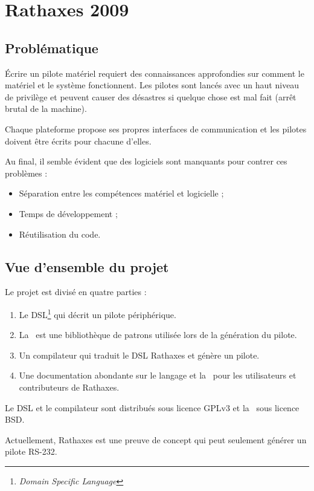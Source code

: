 \section{Rathaxes 2009}

\subsection{Problématique}

Écrire un pilote matériel requiert des connaissances approfondies sur comment le
matériel et le système fonctionnent. Les pilotes sont lancés avec un haut niveau
de privilège et peuvent causer des désastres si quelque chose est mal fait
(arr\^et brutal de la machine)\cite{linux-tutorial}.

Chaque plateforme propose ses propres interfaces de communication et les
pilotes doivent être écrits pour chacune d'elles.

Au final, il semble évident que des logiciels sont manquants pour contrer ces
problèmes :
\begin{itemize}
\item Séparation entre les compétences matériel et logicielle ;
\item Temps de développement ;
\item Réutilisation du code.
\end{itemize}

\subsection{Vue d'ensemble du projet}

Le projet est divisé en quatre parties :
\begin{enumerate}
\item Le DSL\footnote{\emph{Domain Specific Language}} qui décrit un pilote
périphérique.
\item La \BL\ est une bibliothèque de patrons utilisée lors de la génération
du pilote.
\item Un compilateur qui traduit le DSL Rathaxes et génère un pilote.
\item Une documentation abondante sur le langage et la \BL\ pour les
utilisateurs et contributeurs de Rathaxes.
\end{enumerate}

Le DSL et le compilateur sont distribués sous licence GPLv3\cite{GPLv3} et
la \BL\ sous licence BSD\cite{BSD}.

Actuellement, Rathaxes est une preuve de concept qui peut seulement générer un
pilote RS-232.
